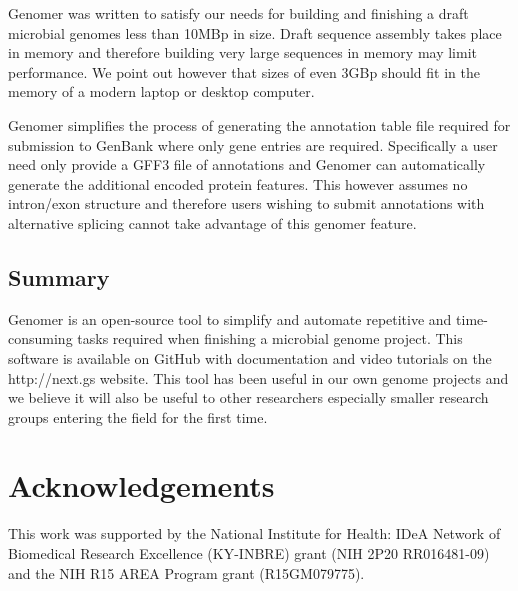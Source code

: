 \documentclass[10pt]{article}
\begin{document}
Genomer was written to satisfy our needs for building and finishing a draft
microbial genomes less than 10MBp in size. Draft sequence assembly takes place
in memory and therefore building very large sequences in memory may limit
performance. We point out however that sizes of even 3GBp should fit in the
memory of a modern laptop or desktop computer.

Genomer simplifies the process of generating the annotation table file required
for submission to GenBank where only gene entries are required. Specifically a
user need only provide a GFF3 file of annotations and Genomer can automatically
generate the additional encoded protein features. This however assumes no
intron/exon structure and therefore users wishing to submit annotations with
alternative splicing cannot take advantage of this genomer feature.

\subsection*{Summary}

Genomer is an open-source tool to simplify and automate repetitive and
time-consuming tasks required when finishing a microbial genome project. This
software is available on GitHub \cite{genomer-github} with documentation and
video tutorials on the http://next.gs website. This tool has been useful in our
own genome projects and we believe it will also be useful to other researchers
especially smaller research groups entering the field for the first time.

\section*{Acknowledgements}

This work was supported by the National Institute for Health: IDeA Network of
Biomedical Research Excellence (KY-INBRE) grant (NIH 2P20 RR016481-09) and the
NIH R15 AREA Program grant (R15GM079775).


\end{document}
